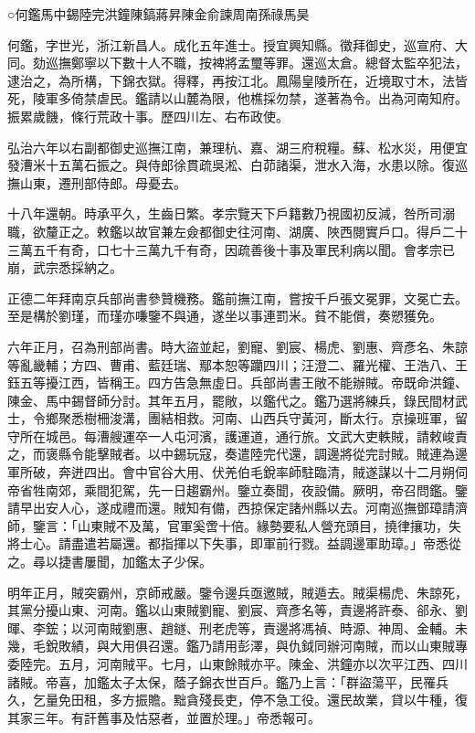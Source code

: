 
\begin{pinyinscope}
○何鑑馬中錫陸完洪鐘陳鎬蔣昇陳金俞諫周南孫祿馬昊

何鑑，字世光，浙江新昌人。成化五年進士。授宜興知縣。徵拜御史，巡宣府、大同。劾巡撫鄭寧以下數十人不職，按裨將孟璽等罪。還巡太倉。總督太監卒犯法，逮治之，為所構，下錦衣獄。得釋，再按江北。鳳陽皇陵所在，近境取寸木，法皆死，陵軍多倚禁虐民。鑑請以山麓為限，他樵採勿禁，遂著為令。出為河南知府。振累歲饑，條行荒政十事。歷四川左、右布政使。

弘治六年以右副都御史巡撫江南，兼理杭、嘉、湖三府稅糧。蘇、松水災，用便宜發漕米十五萬石振之。與侍郎徐貫疏吳淞、白茆諸渠，泄水入海，水患以除。復巡撫山東，遷刑部侍郎。母憂去。

十八年還朝。時承平久，生齒日繁。孝宗覽天下戶籍數乃視國初反減，咎所司溺職，欲釐正之。敕鑑以故官兼左僉都御史往河南、湖廣、陜西閱實戶口。得戶二十三萬五千有奇，口七十三萬九千有奇，因疏善後十事及軍民利病以聞。會孝宗已崩，武宗悉採納之。

正德二年拜南京兵部尚書參贊機務。鑑前撫江南，嘗按千戶張文冕罪，文冕亡去。至是構於劉瑾，而瑾亦嗛鑒不與通，遂坐以事連罰米。貧不能償，奏愬獲免。

六年正月，召為刑部尚書。時大盜並起，劉寵、劉宸、楊虎、劉惠、齊彥名、朱諒等亂畿輔；方四、曹甫、藍廷瑞、鄢本恕等躪四川；汪澄二、羅光權、王浩八、王鈺五等擾江西，皆稱王。四方告急無虛日。兵部尚書王敞不能辦賊。帝既命洪鐘、陳金、馬中錫督師分討。其年五月，罷敞，以鑑代之。鑑乃選將練兵，錄民間材武士，令鄉聚悉樹柵浚溝，團結相救。河南、山西兵守黃河，斷太行。京操班軍，留守所在城邑。每漕艘運卒一人屯河濱，護運道，通行旅。文武大吏軼賊，請敕峻責之，而褒縣令能擊賊者。以中錫玩寇，奏遣陸完代還，調邊將從完討賊。賊連為邊軍所破，奔迸四出。會中官谷大用、伏羌伯毛銳率師駐臨清，賊遂謀以十二月朔伺帝省牲南郊，乘間犯駕，先一日趨霸州。鑒立奏聞，夜設備。厥明，帝召問鑑。鑒請早出安人心，遂成禮而還。賊知有備，西掠保定諸州縣以去。河南巡撫鄧璋請濟師，鑒言：「山東賊不及萬，官軍奚啻十倍。緣勢要私人營充頭目，撓律攘功，失將士心。請盡遣若屬還。都指揮以下失事，即軍前行戮。益調邊軍助璋。」帝悉從之。尋以捷書屢聞，加鑑太子少保。

明年正月，賊突霸州，京師戒嚴。鑒令邊兵亟邀賊，賊遁去。賊渠楊虎、朱諒死，其黨分擾山東、河南。鑑以山東賊劉寵、劉宸、齊彥名等，責邊將許泰、郤永、劉暉、李鋐；以河南賊劉惠、趙鐩、刑老虎等，責邊將馮禎、時源、神周、金輔。未幾，毛銳敗績，與大用俱召還。鑑乃請用彭澤，與仇鉞同辦河南賊，而以山東賊專委陸完。五月，河南賊平。七月，山東餘賊亦平。陳金、洪鐘亦以次平江西、四川諸賊。帝喜，加鑑太子太保，蔭子錦衣世百戶。鑑乃上言：「群盜蕩平，民罹兵久，乞量免田租，多方振贍。黜貪殘長吏，停不急工役。還民故業，貸以牛種，復其家三年。有訐舊事及怙惡者，並置於理。」帝悉報可。


\end{pinyinscope}
